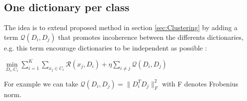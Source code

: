 \subsection{One dictionary per class}
The idea is to extend proposed method in  section \ref{sec:Clustering} by adding a term $\mathcal{Q}(D_i,D_j)$ that promotes incoherence between the differents dictionaries, e.g. this term encourage dictionaries to  be independent as possible :
\begin{center}
 $\underset{D_i, C_i}{\min} \sum_{i=1}^{K} \sum_{x_j \in C_i} \mathcal{R}(x_j,D_i) + \eta \sum_{i \neq j} \mathcal{Q}(D_i,D_j)$
\end{center}
For example we can take $\mathcal{Q}(D_i,D_j) = \|D^T_iD_j\|^2_F $ with F denotes Frobenius norm.
